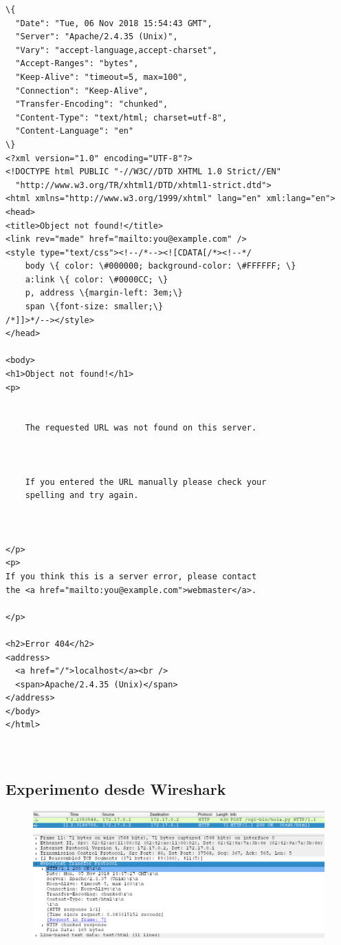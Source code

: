 \documentclass[12pt]{extarticle}
\makeatletter
\def\maxwidth{\ifdim\Gin@nat@width>\linewidth\linewidth
    \else\Gin@nat@width\fi}
\let\Oldincludegraphics\includegraphics
\renewcommand{\includegraphics}[1]{\Oldincludegraphics[width=.8\maxwidth]{#1}}
\makeatother
\begin{document}
    \begin{Verbatim}[commandchars=\\\{\}]
\{
  "Date": "Tue, 06 Nov 2018 15:54:43 GMT",
  "Server": "Apache/2.4.35 (Unix)",
  "Vary": "accept-language,accept-charset",
  "Accept-Ranges": "bytes",
  "Keep-Alive": "timeout=5, max=100",
  "Connection": "Keep-Alive",
  "Transfer-Encoding": "chunked",
  "Content-Type": "text/html; charset=utf-8",
  "Content-Language": "en"
\}
<?xml version="1.0" encoding="UTF-8"?>
<!DOCTYPE html PUBLIC "-//W3C//DTD XHTML 1.0 Strict//EN"
  "http://www.w3.org/TR/xhtml1/DTD/xhtml1-strict.dtd">
<html xmlns="http://www.w3.org/1999/xhtml" lang="en" xml:lang="en">
<head>
<title>Object not found!</title>
<link rev="made" href="mailto:you@example.com" />
<style type="text/css"><!--/*--><![CDATA[/*><!--*/ 
    body \{ color: \#000000; background-color: \#FFFFFF; \}
    a:link \{ color: \#0000CC; \}
    p, address \{margin-left: 3em;\}
    span \{font-size: smaller;\}
/*]]>*/--></style>
</head>

<body>
<h1>Object not found!</h1>
<p>


    The requested URL was not found on this server.

  

    If you entered the URL manually please check your
    spelling and try again.

  

</p>
<p>
If you think this is a server error, please contact
the <a href="mailto:you@example.com">webmaster</a>.

</p>

<h2>Error 404</h2>
<address>
  <a href="/">localhost</a><br />
  <span>Apache/2.4.35 (Unix)</span>
</address>
</body>
</html>



    \end{Verbatim}

    \subsection{Experimento desde
Wireshark}\label{experimento-desde-wireshark}

\begin{figure}[h]
\centering
\includegraphics{images/pto1.png}
\caption{}
\end{figure}
\end{document}
